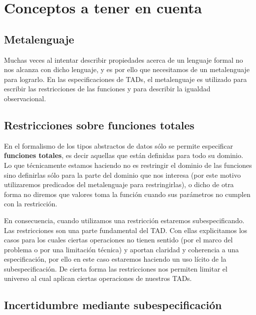 \section{Conceptos a tener en cuenta}
\subsection{Metalenguaje}

Muchas veces al intentar describir propiedades acerca de un lenguaje formal no nos alcanza con dicho lenguaje, y es por ello que necesitamos de un metalenguaje para lograrlo. En las especificaciones de TADs, el metalenguaje es utilizado para escribir las restricciones de las funciones y para describir la igualdad observacional.

\subsection{Restricciones sobre funciones totales}

En el formalismo de los tipos abstractos de datos s\'olo se permite especificar \textbf{funciones totales}, es decir aquellas que est\'an definidas para todo su dominio. Lo que t\'ecnicamente estamos haciendo no es restringir el dominio de las funciones sino definirlas s\'olo para la parte del dominio que nos interesa (por este motivo utilizaremos predicados del metalenguaje para restringirlas), o dicho de otra forma no diremos que valores toma la funci\'on cuando sus par\'ametros no cumplen con la restricci\'on.

En consecuencia, cuando utilizamos una restricci\'on estaremos subespecificando. Las restricciones son una parte fundamental del TAD. Con ellas explicitamos los casos para los cuales ciertas operaciones no tienen sentido (por el marco del problema o por una limitaci\'on t\'ecnica) y aportan claridad y coherencia a una especificaci\'on, por ello en este caso estaremos haciendo un uso l\'icito de la subespecificaci\'on. De cierta forma las restricciones nos permiten limitar el universo al cual aplican ciertas operaciones de nuestros TADs.

\subsection{Incertidumbre mediante subespecificaci\'on}

